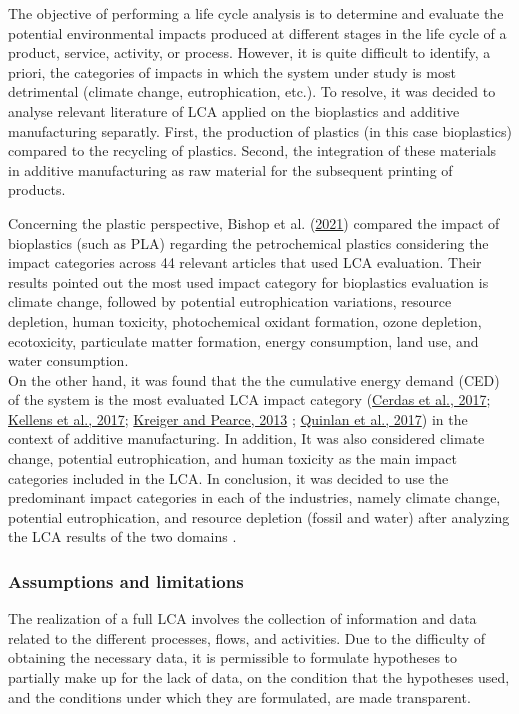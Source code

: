 \documentclass[12pt]{elsarticle} %
\begin{document}
The objective of performing a life cycle analysis is to determine and evaluate the potential environmental impacts produced at different stages in the life cycle of a product, service, activity, or process.
However, it is quite difficult to identify, a priori, the categories of impacts in which the system under study is most detrimental (climate change, eutrophication, etc.).
To resolve, it was decided to analyse relevant literature of LCA applied on the bioplastics and additive manufacturing separatly.
First, the production of plastics (in this case bioplastics) compared to the recycling of plastics.
Second, the integration of these materials in additive manufacturing as raw material for the subsequent printing of products.

Concerning the plastic perspective, Bishop et al. (\protect\hyperlink{ref-Bishop2021}{2021}) compared the impact of bioplastics (such as PLA) regarding the petrochemical plastics considering the impact categories across 44 relevant articles that used LCA evaluation.
Their results pointed out the most used impact category for bioplastics evaluation is climate change, followed by potential eutrophication variations, resource depletion, human toxicity, photochemical oxidant formation, ozone depletion, ecotoxicity, particulate matter formation, energy consumption, land use, and water consumption.\\
On the other hand, it was found that the the cumulative energy demand (CED) of the system is the most evaluated LCA impact category (\protect\hyperlink{ref-cerdas2017}{Cerdas et al., 2017}; \protect\hyperlink{ref-kellens2017}{Kellens et al., 2017}; \protect\hyperlink{ref-Kreiger2013}{Kreiger and Pearce, 2013} ; \protect\hyperlink{ref-quinlan2017}{Quinlan et al., 2017}) in the context of additive manufacturing. In addition, It was also considered climate change, potential eutrophication, and human toxicity as the main impact categories included in the LCA.
In conclusion, it was decided to use the predominant impact categories in each of the industries, namely climate change, potential eutrophication, and resource depletion (fossil and water) after analyzing the LCA results of the two domains .

\hypertarget{assumptions-and-limitations}{%
\subsubsection{Assumptions and limitations}\label{assumptions-and-limitations}}

The realization of a full LCA involves the collection of information and data related to the different processes, flows, and activities.
Due to the difficulty of obtaining the necessary data, it is permissible to formulate hypotheses to partially make up for the lack of data, on the condition that the hypotheses used, and the conditions under which they are formulated, are made transparent.
\end{document}
